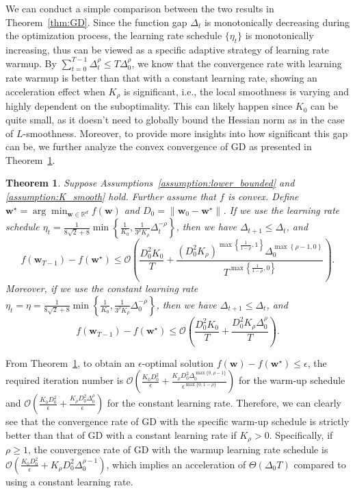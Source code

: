 \documentclass{article}
\newtheorem{theorem}{Theorem}
\newcommand{\Kr}{K_{\rho}}
\newcommand{\paren}[1]{\left( #1 \right)}
\newcommand{\bw}{\mathbf{w}}
\begin{document}
We can conduct a simple comparison between the two results in Theorem~\ref{thm:GD}.
Since the function gap $\Delta_t$ is monotonically decreasing during the optimization process, the learning rate schedule $\{\eta_t\}$ is monotonically 
increasing, thus can be viewed as a specific adaptive strategy of learning rate warmup.
By $\sum_{t=0}^{T-1} \Delta_t^\rho\leq T\Delta_0^{\rho}$, we know that the convergence rate with learning rate warmup is better than that with a constant learning rate, showing an acceleration effect when $K_\rho$ is significant, i.e., the local smoothness is varying and highly dependent on the suboptimality. 
This can likely happen since $K_0$ can be quite small, as it doesn't need to globally bound the Hessian norm as in the case of $L$-smoothness. 
Moreover, to provide more insights into how significant this gap can be, we further analyze the convex convergence of GD as presented in Theorem~\ref{thm:GD_convex}.
\begin{theorem}\label{thm:GD_convex}
{
    Suppose Assumptions~\ref{assumption:lower_bounded} and \ref{assumption:K_smooth} hold. Further assume that $f$ is convex. Define $\bw^\star=\arg\min_{\bw\in\mathbb{R}^d} f(\bw)$ and $D_0=\|\bw_0-\bw^\star\|$.
    If we use the learning rate schedule $\eta_t=\frac{1}{8\sqrt{2}+8}\min\left\{\frac{1}{K_0}, \frac{1}{3^\rho\Kr}\Delta_t^{-\rho}\right\}$, then we have $\Delta_{t+1}\leq\Delta_t$, and 
    $$
    f(\bw_{T-1})-f(\bw^\star)\leq \mathcal{O}\paren{\frac{D_0^2 K_0}{T}+\frac{\paren{D_0^2\Kr}^{\max \left\{\frac{1}{1-\rho}, 1\right\}}\Delta_0^{\max\left\{\rho-1,0\right\}}}{T^{\max\left\{\frac{1}{1-\rho},0\right\}}}}.$$
    Moreover, if we use the constant learning rate $\eta_t=\eta=\frac{1}{8\sqrt{2}+8}\min\left\{\frac{1}{K_0}, \frac{1}{3^\rho\Kr}\Delta_0^{-\rho}\right\}$, then we have $\Delta_{t+1}\leq\Delta_t$, and
    $$
    f(\bw_{T-1})-f(\bw^\star)\leq \mathcal{O}\paren{\frac{D_0^2K_0}{T}+\frac{D_0^2\Kr\Delta_0^\rho}{T}}.$$
}
\end{theorem}
{
From Theorem~\ref{thm:GD_convex}, to obtain an $\epsilon$-optimal solution $f(\bw)-f(\bw^\star)\leq\epsilon$, the required iteration number is 
$ \mathcal{O}\left(\frac{K_0 D_0^2}{\epsilon}+\frac{\Kr D_0^2 \Delta_0^{\max\{0,\rho-1 \}}}{\epsilon^{\max\{0,1-\rho\}}}\right)$ for the warm-up schedule and
$\mathcal{O}\left(\frac{K_0 D_0^2}{\epsilon}+\frac{K_\rho D_0^2 \Delta_0^\rho}{\epsilon}\right)$ for the constant learning rate. Therefore, we can clearly see that the convergence rate of GD with the specific warm-up schedule is strictly better than that of GD with a constant learning rate if $\Kr>0$. Specifically, if $\rho\geq 1$, the convergence rate of GD with the warmup learning rate schedule is $\mathcal{O}\left(\frac{K_0 D_0^2}{\epsilon}+\Kr D_0^2 \Delta_0^{\rho-1 }\right)$, which implies an acceleration of $\Theta(\Delta_0 T)$ compared to using a constant learning rate.
}
\end{document}
